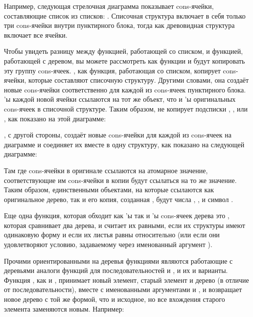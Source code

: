 Например, следующая стрелочная диаграмма показывает cons-ячейки, составляющие список из
списков: . Списочная структура включает в себя только три
cons-ячейки внутри пунктирного блока, тогда как древовидная структура включает все ячейки.


Чтобы увидеть разницу между функцией, работающей со списком, и функцией, работающей с
деревом, вы можете рассмотреть как функции  и  будут
копировать эту группу cons-ячеек. , как функция, работающая со списком,
копирует cons-ячейки, которые составляют списочную структуру. Другими словами, она создаёт
новые cons-ячейки соответственно для каждой из cons-ячеек пунктирного блока. 'ы
каждой новой ячейки ссылаются на тот же объект, что и 'ы оригинальных cons-ячеек
в списочной структуре. Таким образом,  не копирует подсписки , , или , как показано на этой диаграмме:


, с другой стороны, создаёт новые cons-ячейки для каждой из cons-ячеек на
диаграмме и соединяет их вместе в одну структуру, как показано на следующей диаграмме:


Там где cons-ячейки в оригинале ссылаются на атомарное значение, соответствующие им
cons-ячейки в копии будут ссылаться на то же значение.  Таким образом, единственными
объектами, на которые ссылаются как оригинальное дерево, так и его копия, созданная
, будут числа , , и символ .

Еще одна функция, которая обходит как 'ы так и 'ы cons-ячеек дерева
это , которая сравнивает два дерева, и считает их равными, если их
структуры имеют одинаковую форму и если их листья равны относительно  (или если
они удовлетворяют условию, задаваемому через именованный аргумент ).

Прочими ориентированными на деревья функциями являются работающие с деревьями аналоги
функций для последовательностей  и , и их  и
 варианты. Функция , как и , принимает новый
элемент, старый элемент и дерево (в отличие от последовательности), вместе с именованными
аргументами  и , и возвращает новое дерево с той же формой, что и
исходное, но все вхождения старого элемента заменяются новым. Например:


